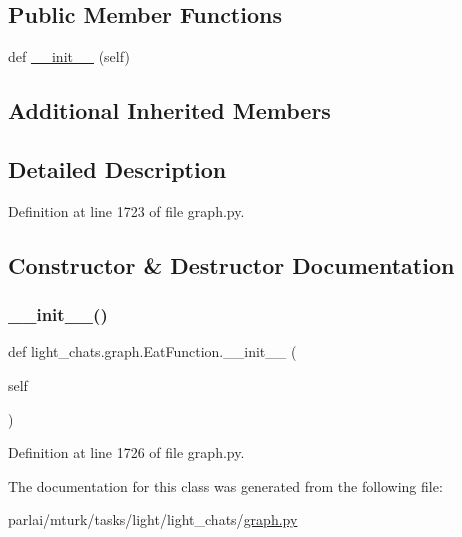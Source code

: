 \subsection*{Public Member Functions}
\begin{DoxyCompactItemize}
\item 
def \hyperlink{classlight__chats_1_1graph_1_1EatFunction_a78b5e03c987945ebced34fe2454613ba}{\+\_\+\+\_\+init\+\_\+\+\_\+} (self)
\end{DoxyCompactItemize}
\subsection*{Additional Inherited Members}


\subsection{Detailed Description}
\begin{DoxyVerb}\end{DoxyVerb}
 

Definition at line 1723 of file graph.\+py.



\subsection{Constructor \& Destructor Documentation}
\mbox{\label{classlight__chats_1_1graph_1_1EatFunction_a78b5e03c987945ebced34fe2454613ba}} 
\subsubsection{\texorpdfstring{\+\_\+\+\_\+init\+\_\+\+\_\+()}{\_\_init\_\_()}}
{\footnotesize\ttfamily def light\+\_\+chats.\+graph.\+Eat\+Function.\+\_\+\+\_\+init\+\_\+\+\_\+ (\begin{DoxyParamCaption}\item[{}]{self }\end{DoxyParamCaption})}



Definition at line 1726 of file graph.\+py.



The documentation for this class was generated from the following file\+:\begin{DoxyCompactItemize}
\item 
parlai/mturk/tasks/light/light\+\_\+chats/\hyperlink{parlai_2mturk_2tasks_2light_2light__chats_2graph_8py}{graph.\+py}\end{DoxyCompactItemize}
